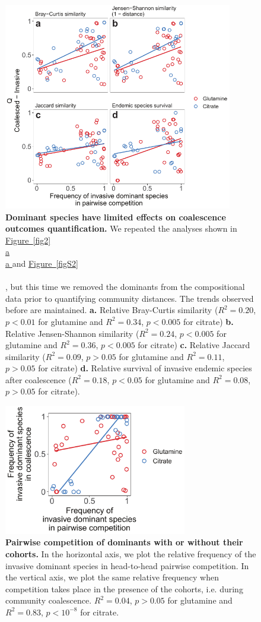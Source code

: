 \documentclass[a4paper,10pt]{article}
\newcommand{\figref}[2][]{%
  \hyperref[{#2}]{%
    Figure~\ref*{#2}%
    \ifx\\#1\\%
    \else
      #1%
    \fi
  }%
}
\begin{document}
\begin{figure}[!h]
\centering
\internallinenumbers
\includegraphics[width=10cm,keepaspectratio]{figs/figS3.pdf}
\caption{\textbf{Dominant species have limited effects on coalescence outcomes quantification.}
We repeated the analyses shown in \figref[a]{fig2} and \figref{figS2}, but this time we removed the
dominants from the compositional data prior to quantifying community distances.
The trends observed before are maintained.
\textbf{a.} Relative Bray-Curtis similarity
($R^2=0.20$, $p<0.01$ for glutamine and $R^2=0.34$, $p<0.005$ for citrate)
\textbf{b.} Relative Jensen-Shannon similarity 
($R^2=0.24$, $p<0.005$ for glutamine and $R^2=0.36$, $p<0.005$ for citrate)
\textbf{c.} Relative Jaccard similarity
($R^2=0.09$, $p>0.05$ for glutamine and $R^2=0.11$, $p>0.05$ for citrate)
\textbf{d.} Relative survival of invasive endemic species after coalescence
($R^2=0.18$, $p<0.05$ for glutamine and $R^2=0.08$, $p>0.05$ for citrate).}
\label{figS3}
\end{figure}

\clearpage

\begin{figure}[!h]
\centering
\internallinenumbers
\includegraphics[width=8cm,keepaspectratio]{figs/figS4.pdf}
\caption{\textbf{Pairwise competition of dominants with or without their cohorts.}
In the horizontal axis, we plot the relative frequency of the invasive dominant species in head-to-head
pairwise competition. In the vertical axis, we plot the same relative frequency when competition takes
place in the presence of the cohorts, i.e. during community coalescence.
$R^2=0.04$, $p>0.05$ for glutamine and $R^2=0.83$, $p<10^{-8}$ for citrate.}
\label{figS4}
\end{figure}

\clearpage
\end{document}
